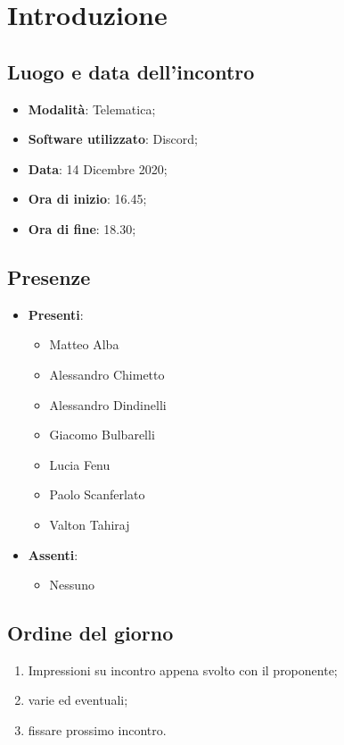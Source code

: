 \documentclass[]{article}
\begin{document}
	

	\newpage


	\section{Introduzione}
		\subsection{Luogo e data dell'incontro}
		\begin{itemize}
			\item \textbf{Modalità}: Telematica;
			\item \textbf{Software utilizzato}: Discord;
			\item \textbf{Data}: 14 Dicembre 2020;
			\item \textbf{Ora di inizio}: 16.45;
			\item \textbf{Ora di fine}: 18.30;
		\end{itemize}

		\subsection{Presenze}
		\begin{itemize}
			\item \textbf{Presenti}:
			\begin{itemize}
				\item Matteo Alba
				\item Alessandro Chimetto
				\item Alessandro Dindinelli
				\item Giacomo Bulbarelli
				\item Lucia Fenu
				\item Paolo Scanferlato
				\item Valton Tahiraj
			\end{itemize}
			\item \textbf{Assenti}:
			\begin{itemize}
				\item Nessuno
			\end{itemize}
		\end{itemize}


		\subsection{Ordine del giorno}
		\begin{enumerate}
			\item Impressioni su incontro appena svolto con il proponente;
			\item varie ed eventuali;
			\item fissare prossimo incontro.
		\end{enumerate}
\end{document}
